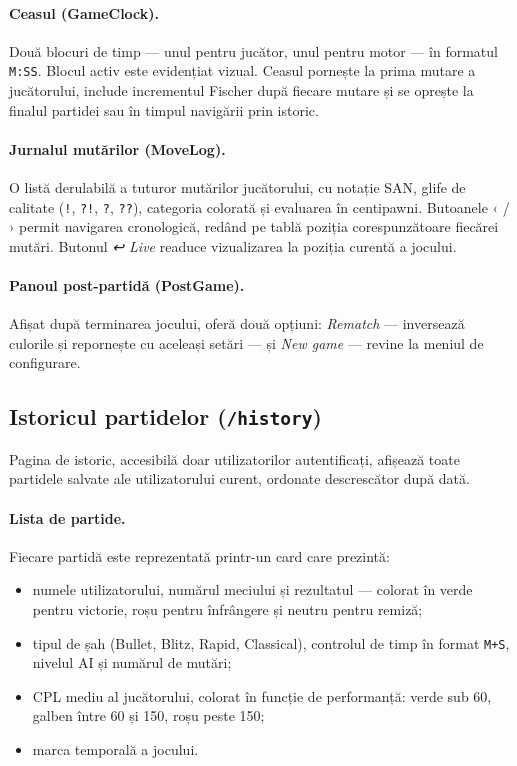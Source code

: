 \documentclass[12pt,a4paper]{article}
\begin{document}
\paragraph{Ceasul (GameClock).}
Două blocuri de timp — unul pentru jucător, unul pentru motor — în formatul \texttt{M:SS}. Blocul activ este evidențiat vizual. Ceasul pornește la prima mutare a jucătorului, include incrementul Fischer după fiecare mutare și se oprește la finalul partidei sau în timpul navigării prin istoric.

\paragraph{Jurnalul mutărilor (MoveLog).}
O listă derulabilă a tuturor mutărilor jucătorului, cu notație SAN, glife de calitate (\texttt{!}, \texttt{?!}, \texttt{?}, \texttt{??}), categoria colorată și evaluarea în centipawni. Butoanele ‹ / › permit navigarea cronologică, redând pe tablă poziția corespunzătoare fiecărei mutări. Butonul \textit{↩ Live} readuce vizualizarea la poziția curentă a jocului.

\paragraph{Panoul post-partidă (PostGame).}
Afișat după terminarea jocului, oferă două opțiuni: \textit{Rematch} — inversează culorile și repornește cu aceleași setări — și \textit{New game} — revine la meniul de configurare.

\subsection{Istoricul partidelor (\texttt{/history})}

Pagina de istoric, accesibilă doar utilizatorilor autentificați, afișează toate partidele salvate ale utilizatorului curent, ordonate descrescător după dată.

\paragraph{Lista de partide.}
Fiecare partidă este reprezentată printr-un card care prezintă:
\begin{itemize}
  \item numele utilizatorului, numărul meciului și rezultatul — colorat în verde pentru victorie, roșu pentru înfrângere și neutru pentru remiză;
  \item tipul de șah (Bullet, Blitz, Rapid, Classical), controlul de timp în format \texttt{M+S}, nivelul AI și numărul de mutări;
  \item CPL mediu al jucătorului, colorat în funcție de performanță: verde sub 60, galben între 60 și 150, roșu peste 150;
  \item marca temporală a jocului.
\end{itemize}
\end{document}
